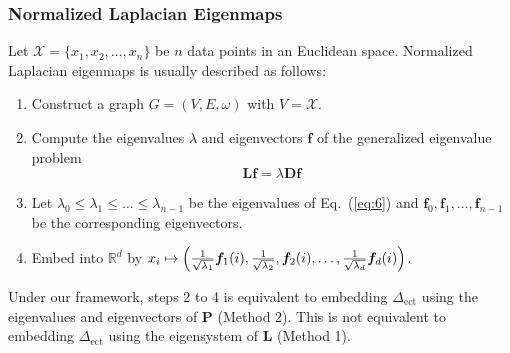 \documentclass[professionalfonts, hyperref={pdfpagelabels=false,
  colorlinks=true, linkcolor=purple}]{beamer}
\begin{document}
\begin{frame}
  \frametitle{Normalized Laplacian Eigenmaps}
  Let $\mathcal{X} = \{x_1,x_2,\dots,x_n\}$ be $n$ data points in an
  Euclidean space. Normalized Laplacian eigenmaps is usually described
  as follows: \vskip10pt
  \begin{enumerate}
  \item Construct a graph $G = (V,E,\omega)$ with $V = \mathcal{X}$.
  \item Compute the eigenvalues $\lambda$ and eigenvectors
    $\bm{f}$ of the generalized eigenvalue problem
    \begin{equation}
      \label{eq:6}
      \bm{Lf} = \lambda \bm{Df}
    \end{equation}
  \item Let $\lambda_0 \leq \lambda_1 \leq \dots \leq \lambda_{n-1}$ be
    the eigenvalues of Eq.~(\ref{eq:6}) and $\bm{f}_0, \bm{f}_1,
    \dots, \bm{f}_{n-1}$ be the corresponding eigenvectors. 
  \item Embed into $\mathbb{R}^{d}$ by
      $x_i \mapsto \Bigl(\tfrac{1}{\sqrt{\lambda_1}} \bm{f}_{1}(i),
      \tfrac{1}{\sqrt{\lambda_2}},
      \bm{f}_{2}(i), \dots, \tfrac{1}{\sqrt{\lambda_d}}
      \bm{f}_{d}(i)\Bigr)$.
  \end{enumerate}
  \vskip10pt
  \begin{alertblock}{}
    Under our framework, steps 2 to 4 is equivalent to embedding
    $\Delta_{\mathrm{ect}}$ using the eigenvalues and
    eigenvectors of $\mathbf{P}$ (Method 2). This is \alert{not} equivalent to
    embedding $\Delta_{\mathrm{ect}}$ using the eigensystem of $\mathbf{L}$ (Method 1). 
  \end{alertblock}
\end{frame}
\end{document}

